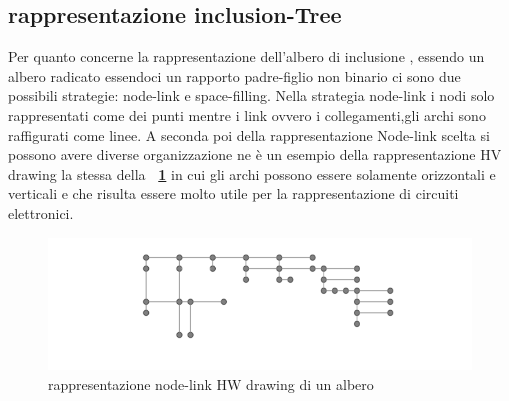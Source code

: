 {\subsection{rappresentazione inclusion-Tree}
Per quanto concerne la rappresentazione dell'albero di inclusione , essendo un albero radicato essendoci un rapporto padre-figlio non binario ci sono due possibili strategie: node-link e space-filling.
Nella strategia node-link i nodi solo rappresentati come dei punti mentre i link ovvero i collegamenti,gli archi sono raffigurati come linee. A seconda poi della rappresentazione Node-link scelta si possono avere diverse organizzazione ne è un esempio della rappresentazione HV drawing la stessa della \textbf{\figurename~\ref{fig:nodeLink}} in cui gli archi possono essere solamente orizzontali e verticali e che risulta essere molto utile per la rappresentazione di circuiti elettronici.
\begin{figure}[!htb]
	\begin{center}
		\includegraphics[width=0.8 \linewidth]{figure/nodeLink}
	\end{center}
	\caption{rappresentazione node-link HW drawing di un albero \label{fig:nodeLink}}
\end{figure}

}

